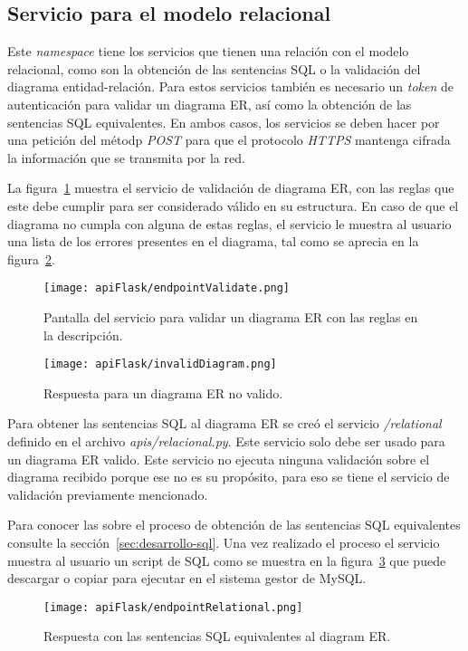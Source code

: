 \subsection{Servicio para el modelo relacional}

Este \textit{namespace} tiene los servicios que tienen una relación con el modelo relacional, como son la obtención de las sentencias SQL o la validación del diagrama entidad-relación. Para estos servicios también es necesario un \textit{token} de autenticación para validar un diagrama ER, así como la obtención de las sentencias SQL equivalentes. En ambos casos, los servicios se deben hacer por una petición del métodp \textit{POST} para que el protocolo \textit{HTTPS} mantenga cifrada la información que se transmita por la red.

La figura~\ref{img:validateER} muestra el servicio de validación de diagrama ER, con las reglas que este debe cumplir para ser considerado válido en su estructura. En caso de que el diagrama no cumpla con alguna de estas reglas, el servicio le muestra al usuario una lista de los errores presentes en el diagrama, tal como se aprecia en la figura~\ref{img:invalidDiagram}.

\begin{figure}[H]
  \centering
  \texttt{[image: apiFlask/endpointValidate.png]}
  \caption{Pantalla del servicio para validar un diagrama ER con las reglas en la descripción.}
  \label{img:validateER}
\end{figure}

\begin{figure}[H]
  \centering
  \texttt{[image: apiFlask/invalidDiagram.png]}
  \caption{Respuesta para un diagrama ER no valido.}
  \label{img:invalidDiagram}
\end{figure}

Para obtener las sentencias SQL al diagrama ER se creó el servicio \textit{/relational} definido en el archivo \textit{apis/relacional.py}. Este servicio solo debe ser usado para un diagrama ER valido. Este servicio no ejecuta ninguna validación sobre el diagrama recibido porque ese no es su propósito, para eso se tiene el servicio de validación previamente mencionado.

Para conocer las sobre el proceso de obtención de las sentencias SQL equivalentes consulte la sección~\ref{sec:desarrollo-sql}. Una vez realizado el proceso el servicio muestra al usuario un script de SQL como se muestra en la figura~\ref{img:sqlSentences} que puede descargar o copiar para ejecutar en el sistema gestor de MySQL.


\begin{figure}[H]
  \centering
  \texttt{[image: apiFlask/endpointRelational.png]}
  \caption{Respuesta con las sentencias SQL equivalentes al diagram ER.}
  \label{img:sqlSentences}
\end{figure}